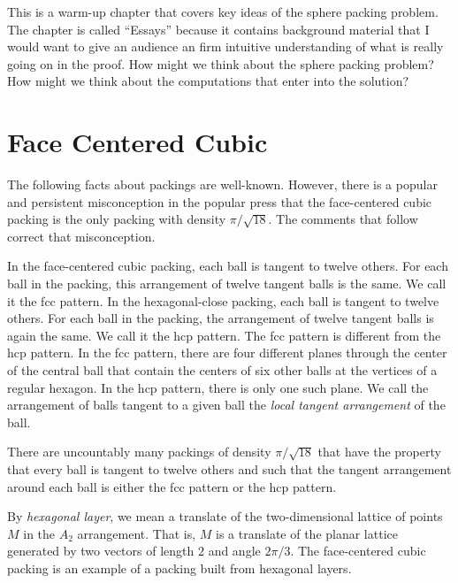
This is a warm-up chapter that covers key ideas of the sphere packing problem.
The chapter is called ``Essays'' because it contains background material
that I would want to give an audience an firm intuitive understanding of what is really going on in the proof.   How might we think about the sphere packing problem?  How might we think about the computations that enter into the solution?


\section{Face Centered Cubic}



The following facts about packings are well-known.  However, there
is a popular and persistent misconception in the popular press
that the face-centered cubic packing is the only packing with
density $\pi/\sqrt{18}$. The comments that follow correct that
misconception.

In the face-centered cubic packing, each ball is tangent to twelve
others.  For each ball in the packing, this arrangement of twelve
tangent balls is the same.  We call it the fcc pattern. In the
hexagonal-close packing, each ball is tangent to twelve others.
For each ball in the packing, the arrangement of twelve tangent
balls is again the same.  We call it the hcp pattern.  The fcc
pattern is different from the hcp pattern.  In the fcc pattern,
there are four different planes through the center of the central
ball that contain the centers of six other balls at the vertices
of a regular hexagon.  In the hcp pattern, there is only one such
plane.  We call the arrangement of balls tangent to a given ball
the {\it local tangent arrangement} of the ball.

There are uncountably many packings of density $\pi/\sqrt{18}$
that have the property that every ball is tangent to twelve others
and such that the tangent arrangement around each ball is either
the fcc pattern or the hcp pattern.

By {\it hexagonal layer}, we mean a translate of the two-dimensional
lattice of points $M$ in the $A_2$ arrangement. That is, $M$ is a
translate of the planar lattice generated by two vectors of length
$2$ and angle $2\pi/3$.  The face-centered cubic packing is an
example of a packing built from hexagonal layers.

